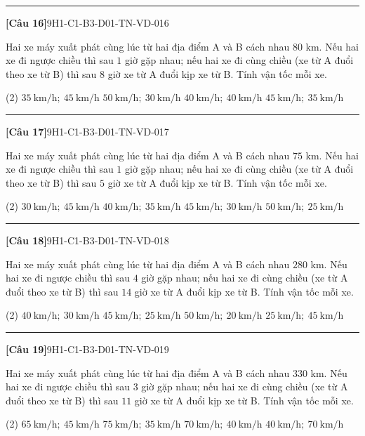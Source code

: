 \documentclass[12pt,a4paper]{article}
\newif\ifloigiai
\newenvironment{cauhoi}[2]{%
  \par\medskip\noindent\rule{\textwidth}{0.4pt}\par\nopagebreak
  \noindent\textbf{[#1]}\hfill{\scriptsize\ttfamily #2}\par\nopagebreak\smallskip}{\par}
\newcommand{\dapan}[1]{\ifloigiai\par\smallskip\noindent\textit{Đáp án:} \textbf{#1}\par\fi}
\begin{document}
\begin{cauhoi}{Câu 16}{9H1-C1-B3-D01-TN-VD-016}
Hai xe máy xuất phát cùng lúc từ hai địa điểm A và B cách nhau $80$ km. Nếu hai xe đi ngược chiều thì sau $1$ giờ gặp nhau; nếu hai xe đi cùng chiều (xe từ A đuổi theo xe từ B) thì sau $8$ giờ xe từ A đuổi kịp xe từ B. Tính vận tốc mỗi xe.
\begin{tasks}(2)
\task $35\ \text{km/h};\ 45\ \text{km/h}$
\task $50\ \text{km/h};\ 30\ \text{km/h}$
\task $40\ \text{km/h};\ 40\ \text{km/h}$
\task $45\ \text{km/h};\ 35\ \text{km/h}$
\end{tasks}
\dapan{D}
\end{cauhoi}
\begin{cauhoi}{Câu 17}{9H1-C1-B3-D01-TN-VD-017}
Hai xe máy xuất phát cùng lúc từ hai địa điểm A và B cách nhau $75$ km. Nếu hai xe đi ngược chiều thì sau $1$ giờ gặp nhau; nếu hai xe đi cùng chiều (xe từ A đuổi theo xe từ B) thì sau $5$ giờ xe từ A đuổi kịp xe từ B. Tính vận tốc mỗi xe.
\begin{tasks}(2)
\task $30\ \text{km/h};\ 45\ \text{km/h}$
\task $40\ \text{km/h};\ 35\ \text{km/h}$
\task $45\ \text{km/h};\ 30\ \text{km/h}$
\task $50\ \text{km/h};\ 25\ \text{km/h}$
\end{tasks}
\dapan{C}
\end{cauhoi}
\begin{cauhoi}{Câu 18}{9H1-C1-B3-D01-TN-VD-018}
Hai xe máy xuất phát cùng lúc từ hai địa điểm A và B cách nhau $280$ km. Nếu hai xe đi ngược chiều thì sau $4$ giờ gặp nhau; nếu hai xe đi cùng chiều (xe từ A đuổi theo xe từ B) thì sau $14$ giờ xe từ A đuổi kịp xe từ B. Tính vận tốc mỗi xe.
\begin{tasks}(2)
\task $40\ \text{km/h};\ 30\ \text{km/h}$
\task $45\ \text{km/h};\ 25\ \text{km/h}$
\task $50\ \text{km/h};\ 20\ \text{km/h}$
\task $25\ \text{km/h};\ 45\ \text{km/h}$
\end{tasks}
\dapan{B}
\end{cauhoi}
\begin{cauhoi}{Câu 19}{9H1-C1-B3-D01-TN-VD-019}
Hai xe máy xuất phát cùng lúc từ hai địa điểm A và B cách nhau $330$ km. Nếu hai xe đi ngược chiều thì sau $3$ giờ gặp nhau; nếu hai xe đi cùng chiều (xe từ A đuổi theo xe từ B) thì sau $11$ giờ xe từ A đuổi kịp xe từ B. Tính vận tốc mỗi xe.
\begin{tasks}(2)
\task $65\ \text{km/h};\ 45\ \text{km/h}$
\task $75\ \text{km/h};\ 35\ \text{km/h}$
\task $70\ \text{km/h};\ 40\ \text{km/h}$
\task $40\ \text{km/h};\ 70\ \text{km/h}$
\end{tasks}
\dapan{C}
\end{cauhoi}
\end{document}
